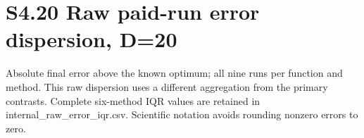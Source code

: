 \documentclass[11pt,a4paper]{article}
\begin{document}
\begin{minipage}{\linewidth}
\end{minipage}\par

\newpage

\hypertarget{s4.20-raw-paid-run-error-dispersion-d20}{%
\section{S4.20 Raw paid-run error dispersion,
D=20}\label{s4.20-raw-paid-run-error-dispersion-d20}}

Absolute final error above the known optimum; all nine runs per function
and method. This raw dispersion uses a different aggregation from the
primary contrasts. Complete six-method IQR values are retained in
internal\_raw\_error\_iqr.csv. Scientific notation avoids rounding
nonzero errors to zero.
\end{document}
